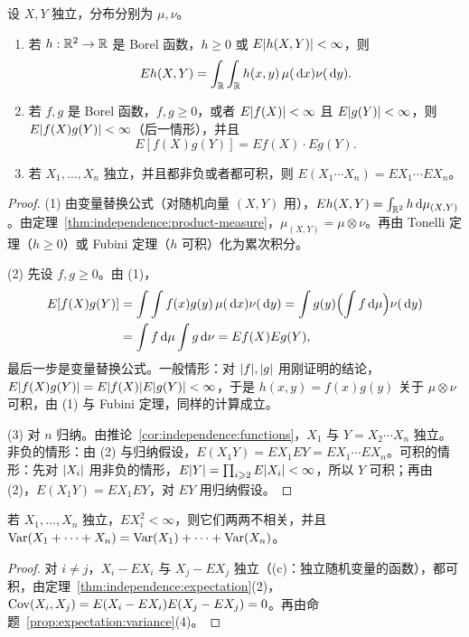 \begin{theorem}[独立随机变量的期望]\label{thm:independence:expectation}
设 $X,Y$ 独立，分布分别为 $\mu,\nu$。
\begin{enumerate}
\item 若 $h:\mathbb{R}^2\to\mathbb{R}$ 是 Borel 函数，$h\geqslant0$ 或 $E\lvert h(X,Y)\rvert<\infty$，则
\[
Eh(X,Y)=\int_{\mathbb{R}}\int_{\mathbb{R}} h(x,y)\,\mu(\,\mathrm{d} x)\nu(\,\mathrm{d} y).
\]
\item 若 $f,g$ 是 Borel 函数，$f,g\geqslant0$，或者 $E\lvert f(X)\rvert<\infty$ 且 $E\lvert g(Y)\rvert<\infty$，则 $E\lvert f(X)g(Y)\rvert<\infty$（后一情形），并且
\[
E[f(X)g(Y)]=Ef(X)\cdot Eg(Y).
\]
\item 若 $X_1,\dots,X_n$ 独立，并且都非负或者都可积，则 $E(X_1\cdots X_n)=EX_1\cdots EX_n$。
\end{enumerate}
\end{theorem}
\begin{proof}
(1) 由变量替换公式（对随机向量 $(X,Y)$ 用），$Eh(X,Y)=\int_{\mathbb{R}^2}h\,\mathrm{d}\mu_{(X,Y)}$。由定理~\ref{thm:independence:product-measure}，$\mu_{(X,Y)}=\mu\otimes\nu$。再由 Tonelli 定理（$h\geqslant0$）或 Fubini 定理（$h$ 可积）化为累次积分。

(2) 先设 $f,g\geqslant0$。由 (1)，
\[
\begin{aligned}
E[f(X)g(Y)]&=\int\int f(x)g(y)\,\mu(\,\mathrm{d} x)\nu(\,\mathrm{d} y)=\int g(y)\Bigl(\int f\,\mathrm{d}\mu\Bigr)\nu(\,\mathrm{d} y)\\
&=\int f\,\mathrm{d}\mu\int g\,\mathrm{d}\nu=Ef(X)Eg(Y),
\end{aligned}
\]
最后一步是变量替换公式。一般情形：对 $\lvert f\rvert,\lvert g\rvert$ 用刚证明的结论，$E\lvert f(X)g(Y)\rvert=E\lvert f(X)\rvert E\lvert g(Y)\rvert<\infty$，于是 $h(x,y)=f(x)g(y)$ 关于 $\mu\otimes\nu$ 可积，由 (1) 与 Fubini 定理，同样的计算成立。

(3) 对 $n$ 归纳。由推论~\ref{cor:independence:functions}，$X_1$ 与 $Y=X_2\cdots X_n$ 独立。非负的情形：由 (2) 与归纳假设，$E(X_1Y)=EX_1EY=EX_1\cdots EX_n$。可积的情形：先对 $\lvert X_i\rvert$ 用非负的情形，$E\lvert Y\rvert=\prod_{i\geqslant2}E\lvert X_i\rvert<\infty$，所以 $Y$ 可积；再由 (2)，$E(X_1Y)=EX_1EY$，对 $EY$ 用归纳假设。
\end{proof}

\begin{corollary}[独立和的方差]\label{cor:independence:variance}
若 $X_1,\dots,X_n$ 独立，$EX_i^2<\infty$，则它们两两不相关，并且 $\operatorname{Var}(X_1+\cdots+X_n)=\operatorname{Var}(X_1)+\cdots+\operatorname{Var}(X_n)$。
\end{corollary}
\begin{proof}
对 $i\neq j$，$X_i-EX_i$ 与 $X_j-EX_j$ 独立（(c)：独立随机变量的函数），都可积，由定理~\ref{thm:independence:expectation}(2)，$\operatorname{Cov}(X_i,X_j)=E(X_i-EX_i)E(X_j-EX_j)=0$。再由命题~\ref{prop:expectation:variance}(4)。
\end{proof}

